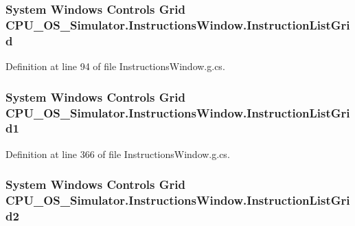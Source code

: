\subsubsection[{Instruction\+List\+Grid}]{\setlength{\rightskip}{0pt plus 5cm}System Windows Controls Grid C\+P\+U\+\_\+\+O\+S\+\_\+\+Simulator.\+Instructions\+Window.\+Instruction\+List\+Grid\hspace{0.3cm}{\ttfamily [package]}}\label{class_c_p_u___o_s___simulator_1_1_instructions_window_af568f7891b3381f9bec2f0d5b2d0d8c6}


Definition at line 94 of file Instructions\+Window.\+g.\+cs.

\hypertarget{class_c_p_u___o_s___simulator_1_1_instructions_window_a8f09b0005016c225169d7e9dd2724053}{}
\subsubsection[{Instruction\+List\+Grid1}]{\setlength{\rightskip}{0pt plus 5cm}System Windows Controls Grid C\+P\+U\+\_\+\+O\+S\+\_\+\+Simulator.\+Instructions\+Window.\+Instruction\+List\+Grid1\hspace{0.3cm}{\ttfamily [package]}}\label{class_c_p_u___o_s___simulator_1_1_instructions_window_a8f09b0005016c225169d7e9dd2724053}


Definition at line 366 of file Instructions\+Window.\+g.\+cs.

\hypertarget{class_c_p_u___o_s___simulator_1_1_instructions_window_a33108da9779c5108fc5dd303a8d33454}{}
\subsubsection[{Instruction\+List\+Grid2}]{\setlength{\rightskip}{0pt plus 5cm}System Windows Controls Grid C\+P\+U\+\_\+\+O\+S\+\_\+\+Simulator.\+Instructions\+Window.\+Instruction\+List\+Grid2\hspace{0.3cm}{\ttfamily [package]}}\label{class_c_p_u___o_s___simulator_1_1_instructions_window_a33108da9779c5108fc5dd303a8d33454}


